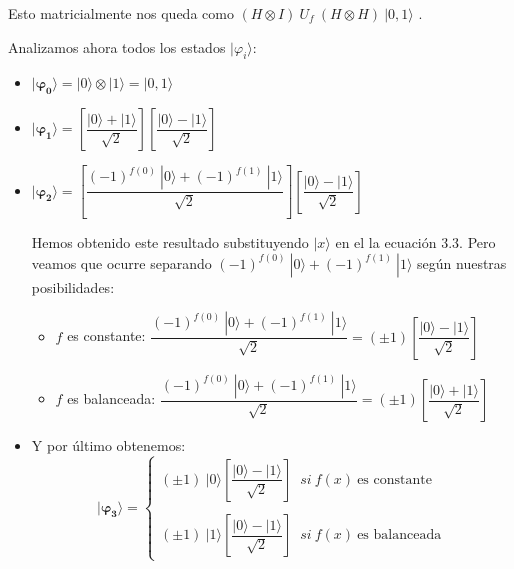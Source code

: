 \vspace{30pt}

Esto matricialmente nos queda como $(H\otimes I)\:U_{f}\:(H\otimes H)\:|0,1\rangle$ .\newline

Analizamos ahora todos los estados $|\varphi_{i}\rangle$:

\begin{itemize}
    \item $\mathbf{|\varphi_{0}\rangle} = |0\rangle \otimes |1\rangle = |0,1\rangle$

    \vspace{5pt}

    \item  $\mathbf{|\varphi_{1}\rangle} = \left[ \dfrac{|0\rangle + |1\rangle}{\sqrt{2}}\right] \left[ \dfrac{|0\rangle - |1\rangle}{\sqrt{2}}\right]$

    \vspace{5pt}

    \item $\mathbf{|\varphi_{2}\rangle} = \left[ \dfrac{(-1)^{f(0)}\:|0\rangle + (-1)^{f(1)}\:|1\rangle}{\sqrt{2}}\right] \left[ \dfrac{|0\rangle - |1\rangle}{\sqrt{2}}\right]$\newline 
    
    Hemos obtenido este resultado substituyendo $|x\rangle$ en el la ecuación 3.3. Pero veamos que ocurre separando $(-1)^{f(0)}\:|0\rangle + (-1)^{f(1)}\:|1\rangle$ según nuestras posibilidades:
    \begin{itemize}
        \item $f$ es constante: $\dfrac{(-1)^{f(0)}\:|0\rangle + (-1)^{f(1)}\:|1\rangle}{\sqrt{2}} = (\pm 1)\left[ \dfrac{|0\rangle - |1\rangle}{\sqrt{2}}\right]$

        \vspace{5pt}
        
        \item $f$ es balanceada: $\dfrac{(-1)^{f(0)}\:|0\rangle + (-1)^{f(1)}\:|1\rangle}{\sqrt{2}} = (\pm 1)\left[ \dfrac{|0\rangle + |1\rangle}{\sqrt{2}}\right]$

    \end{itemize}

    \vspace{5pt}
    
    \item Y por último obtenemos:
    \begin{equation}\mathbf{|\varphi_{3}\rangle} = \begin{cases} (\pm 1)\:|0\rangle \left[ \dfrac{|0\rangle - |1\rangle}{\sqrt{2}}\right] \;\; si \: f(x)\:\text{es constante} \\ \\ (\pm 1)\:|1\rangle \left[ \dfrac{|0\rangle - |1\rangle}{\sqrt{2}}\right] \;\; si \: f(x)\:\text{es balanceada} \end{cases}\end{equation}
\end{itemize}

